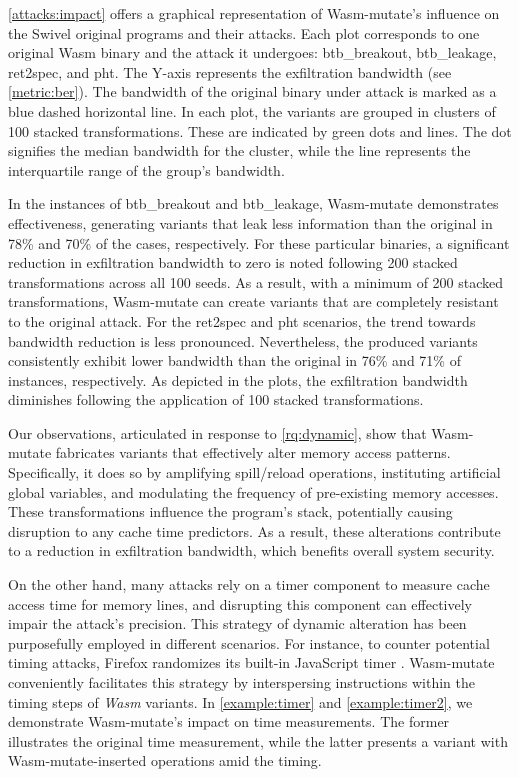 \documentclass[sigplan,screen]{acmart}
\newcommand{\tool}{Wasm-mutate\xspace}
\newcommand{\wasm}{Wasm\xspace}
\begin{document}
\autoref{attacks:impact} offers a graphical representation of \tool's influence on the Swivel original programs and their attacks. 
Each plot corresponds to one original \wasm binary and the attack it undergoes: btb\_breakout, btb\_leakage, ret2spec, and pht.
The Y-axis represents the exfiltration bandwidth (see \autoref{metric:ber}). 
The bandwidth of the original binary under attack is marked as a blue  dashed horizontal line.
In each plot, the variants are grouped in clusters of 100 stacked transformations. 
These are indicated by green dots and lines. 
The dot signifies the median bandwidth for the cluster, while the line represents the interquartile range of the group's bandwidth.



In the instances of btb\_breakout and btb\_leakage, \tool demonstrates effectiveness, generating variants that leak less information than the original in 78\% and 70\% of the cases, respectively.
For these particular binaries, a significant reduction in exfiltration bandwidth to zero is noted following 200 stacked transformations across all 100 seeds.
As a result, with a minimum of 200 stacked transformations, \tool can create variants that are completely resistant to the original attack.
For the ret2spec and pht scenarios, the trend towards bandwidth reduction is less pronounced.
Nevertheless, the produced variants consistently exhibit lower bandwidth than the original in 76\% and 71\% of instances, respectively.
As depicted in the plots, the exfiltration bandwidth diminishes following the application of 100 stacked transformations.

Our observations, articulated in response to \ref{rq:dynamic}, show that \tool fabricates variants that effectively alter memory access patterns. 
Specifically, it does so by amplifying spill/reload operations, instituting artificial global variables, and modulating the frequency of pre-existing memory accesses. 
These transformations influence the program's stack, potentially causing disruption to any cache time predictors. 
As a result, these alterations contribute to a reduction in exfiltration bandwidth, which benefits overall system security.

On the other hand, many attacks rely on a timer component to measure cache access time for memory lines, and disrupting this component can effectively impair the attack's precision. 
This strategy of dynamic alteration has been purposefully employed in different scenarios. 
For instance, to counter potential timing attacks, Firefox randomizes its built-in JavaScript timer \cite{10.1007/978-3-319-70972-7_13}. \tool conveniently facilitates this strategy by interspersing instructions within the timing steps of \textit{\wasm} variants. 
In \autoref{example:timer} and \autoref{example:timer2}, we demonstrate \tool's impact on time measurements. 
The former illustrates the original time measurement, while the latter presents a variant with \tool-inserted operations amid the timing.
\end{document}
